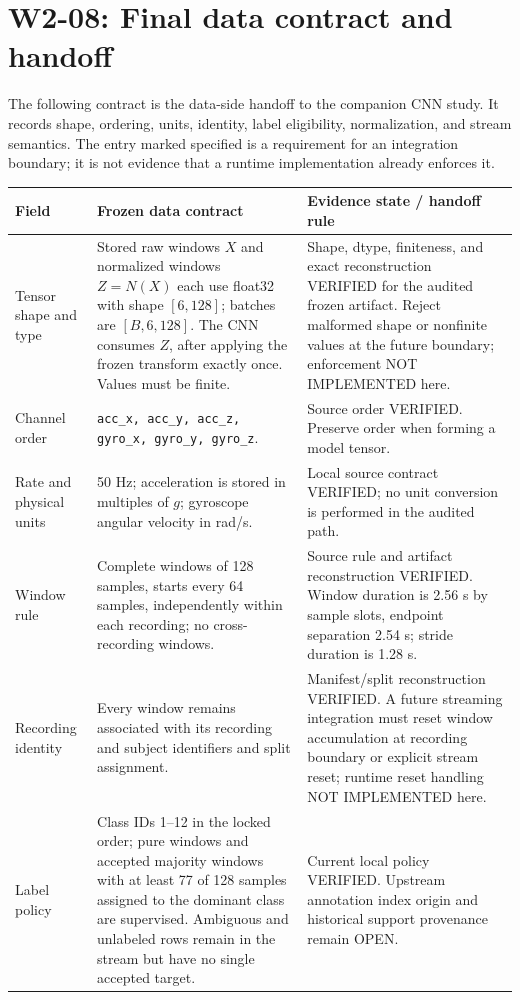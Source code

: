 \documentclass[11pt,a4paper]{article}
\newcommand{\code}[1]{{\small\ttfamily\nolinkurl{#1}}}
\begin{document}
\section{W2-08: Final data contract and handoff}
The following contract is the data-side handoff to the companion CNN study. It records shape, ordering, units, identity, label eligibility, normalization, and stream semantics. The entry marked specified is a requirement for an integration boundary; it is not evidence that a runtime implementation already enforces it.

{\small\renewcommand{\arraystretch}{1.08}
\begin{longtable}{@{}P{2.65cm}P{6.2cm}P{6.1cm}@{}}\toprule
Field & Frozen data contract & Evidence state / handoff rule\\\midrule\endhead
Tensor shape and type & Stored raw windows $X$ and normalized windows $Z=N(X)$ each use float32 with shape $[6,128]$; batches are $[B,6,128]$. The CNN consumes $Z$, after applying the frozen transform exactly once. Values must be finite. & Shape, dtype, finiteness, and exact reconstruction VERIFIED for the audited frozen artifact. Reject malformed shape or nonfinite values at the future boundary; enforcement NOT IMPLEMENTED here.\\
Channel order & \code{acc_x, acc_y, acc_z, gyro_x, gyro_y, gyro_z}. & Source order VERIFIED. Preserve order when forming a model tensor.\\
Rate and physical units & 50 Hz; acceleration is stored in multiples of $g$; gyroscope angular velocity in rad/s. & Local source contract VERIFIED; no unit conversion is performed in the audited path.\\
Window rule & Complete windows of 128 samples, starts every 64 samples, independently within each recording; no cross-recording windows. & Source rule and artifact reconstruction VERIFIED. Window duration is 2.56 s by sample slots, endpoint separation 2.54 s; stride duration is 1.28 s.\\
Recording identity & Every window remains associated with its recording and subject identifiers and split assignment. & Manifest/split reconstruction VERIFIED. A future streaming integration must reset window accumulation at recording boundary or explicit stream reset; runtime reset handling NOT IMPLEMENTED here.\\
Label policy & Class IDs 1--12 in the locked order; pure windows and accepted majority windows with at least 77 of 128 samples assigned to the dominant class are supervised. Ambiguous and unlabeled rows remain in the stream but have no single accepted target. & Current local policy VERIFIED. Upstream annotation index origin and historical support provenance remain OPEN.\\

\end{longtable}}
\end{document}
